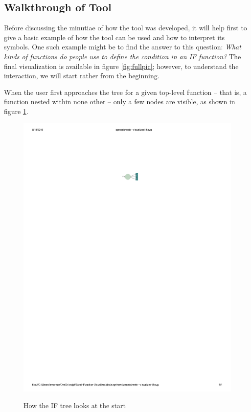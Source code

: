 \documentclass[conference]{IEEEtran}
\begin{document}
	\subsection{Walkthrough of Tool} Before
	discussing the minutiae of how the tool was developed, it will help first to
	give a basic example of how the tool can be used and how to interpret its
	symbols. One such example might be to find the answer to this question:
	\textit{ What kinds of functions do people use to define the condition in an IF
		function?} The final visualization is available in figure \ref{fig:fullpic};
	however, to understand the interaction, we will start rather from the
	beginning. \par
	
	When the user first approaches the tree for a given top-level function -- that
	is, a function nested within none other -- only a few nodes are visible, as
	shown in figure \ref{fig:startpic}. \par
	
	\begin{figure}
		\centering
		\includegraphics{start}
		\label{fig:startpic}
		\caption{How the IF tree looks at the start}
	\end{figure}
	
\end{document}
